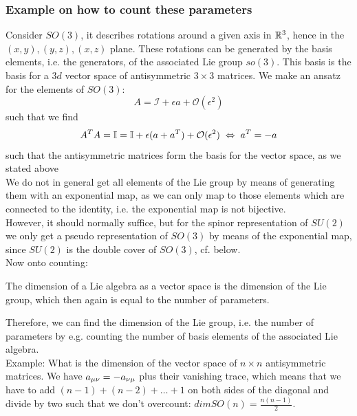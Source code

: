 \subsubsection{Example on how to count these parameters}
Consider $SO(3)$, it describes rotations around a given axis in $\mathbb{R}^3$, hence in the $(x,y),(y,z),(x,z)$ plane. These rotations can be generated by the basis elements, i.e. the generators, of the associated Lie group $so(3)$. This basis is the basis for a $3d$ vector space of antisymmetric $3\times3$ matrices. We make an ansatz for the elements of $SO(3)$:
\begin{equation}
	A = \mathcal{I}+\epsilon a + \mathcal{O}(\epsilon^2)
\end{equation}
such that we find
\begin{equation*}
	A^T A = \mathbb{I} = \mathbb{I} + \epsilon (a + a^T) + \mathcal{O}(\epsilon^2) \; \Leftrightarrow\; a^T=-a
\end{equation*}
such that the antisymmetric matrices form the basis for the vector space, as we stated above\\
We do not in general get all elements of the Lie group by means of generating them with an exponential map, as we can only map to those elements which are connected to the identity, i.e. the exponential map is not bijective.\\
However, it should normally suffice, but for the spinor representation of $SU(2)$ we only get a pseudo representation of $SO(3)$ by means of the exponential map, since $SU(2)$ is the double cover of $SO(3)$, cf. below.\\
Now onto counting:
\begin{mybox}{}
	The dimension of a Lie algebra as a vector space is the dimension of the Lie group, which then again is equal to the number of parameters.
\end{mybox}
Therefore, we can find the dimension of the Lie group, i.e. the number of parameters by e.g. counting the number of basis elements of the associated Lie algebra.\\
Example: What is the dimension of the vector space of $n\times n$ antisymmetric matrices. We have $a_{\mu \nu} = - a_{\nu\mu}$ plus their vanishing trace, which means that we have to add $(n-1)+(n-2)+\dots+1$ on both sides of the diagonal and divide by two such that we don't overcount: $dimSO(n)=\frac{n(n-1)}{2}$.
